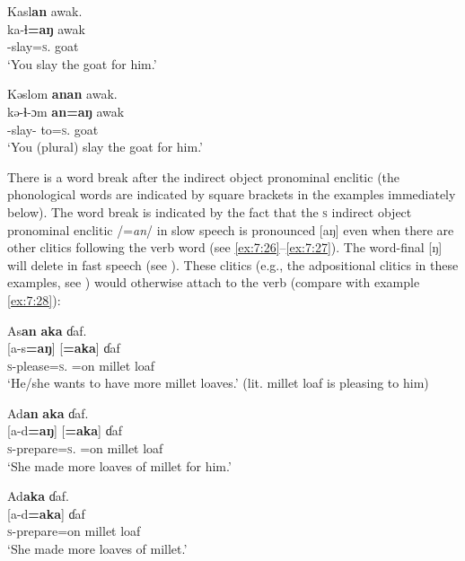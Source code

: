 \ea\label{ex:7:24}
Kasl\textbf{an}  awak.\\
\gll ka-ɬ\textbf{=aŋ}      awak\\
{\twoS}-slay=\textsc{s}.{\IO}    goat\\
\glt ‘You slay the goat for him.’ 
\z

\ea\label{ex:7:25}
Kəslom  \textbf{anan}  awak.\\
\gll kə-ɬ{}-ɔm  \textbf{an=aŋ}    awak\\
-slay-{\twoP}  to=\textsc{s}.{\IO}  goat\\
\glt ‘You (plural) slay the goat for him.’  
\z

There is a word break after the indirect object pronominal enclitic (the phonological words are indicated by square brackets in the examples immediately below).  The word break is indicated by the fact that the \textsc{s} indirect object pronominal enclitic /=\textit{an}/ in slow speech is pronounced [aŋ] even when there are other clitics following the verb word (see \ref{ex:7:26}--\ref{ex:7:27}). The word-final [ŋ] will delete in fast speech (see ). These clitics (e.g., the adpositional clitics in these examples, see ) would otherwise attach to the verb (compare with example \ref{ex:7:28}):

\ea\label{ex:7:26}
As\textbf{an}  \textbf{aka}  ɗaf.\\
\gll {}[a-s\textbf{=aŋ}] [\textbf{=aka}]    ɗaf\\
\textsc{s}-please=\textsc{s}.{\IO}  =on    {millet loaf}\\
\glt ‘He/she wants to have more millet loaves.’ (lit. millet loaf is pleasing to him)  
\z

\ea\label{ex:7:27}
Ad\textbf{an}  \textbf{aka}  ɗaf.\\
\gll {}[a-d\textbf{=aŋ}] [\textbf{=aka}]    ɗaf\\
\textsc{s}-prepare=\textsc{s}.{\IO}  =on    {millet loaf}\\
\glt ‘She made more loaves of millet for him.’
\z

\ea\label{ex:7:28}
Ad\textbf{aka}  ɗaf.\\
\gll {}[a-d\textbf{=aka}]        ɗaf\\
\textsc{s}-prepare=on      {millet loaf}\\
\glt ‘She made more loaves of millet.’  
\z

